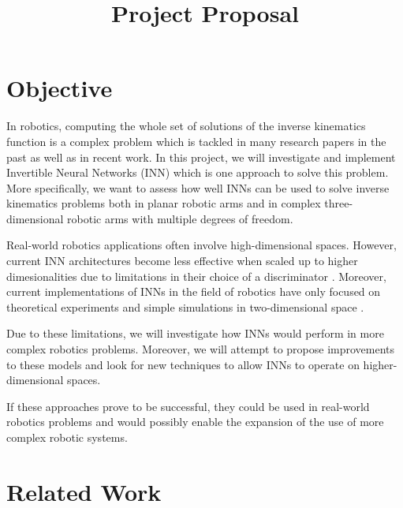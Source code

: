 \documentclass[conference]{IEEEtran}
\begin{document}
\nocite{*}

\title{Project Proposal}

\author{
    \and
}

\maketitle

\section*{Objective}

In robotics, computing the whole set of solutions of the inverse kinematics function is a complex problem which is tackled in many research papers in the past as well as in recent work. In this project, we will investigate and implement Invertible Neural Networks (INN) \cite{Ardizzone2018} which is one approach to solve this problem. More specifically, we want to assess how well INNs can be used to solve inverse kinematics problems
both in planar robotic arms and in complex three-dimensional robotic arms with multiple degrees of freedom.

Real-world robotics applications often involve high-dimensional spaces. However, current INN architectures become less effective when scaled up to higher dimesionalities
due to limitations in their choice of a discriminator \cite{Ardizzone2018}. Moreover, current implementations of INNs in the field of robotics have only focused on theoretical experiments and simple simulations in two-dimensional space \cite{Ardizzone2018}.

Due to these limitations, we will investigate how INNs would perform in more complex robotics problems. Moreover, we will attempt to propose improvements to these models and look for new techniques to allow INNs to operate on higher-dimensional spaces.

If these approaches prove to be successful, they could be used in real-world robotics problems
and would possibly enable the expansion of the use of more complex robotic systems.

\section*{Related Work}
\end{document}
